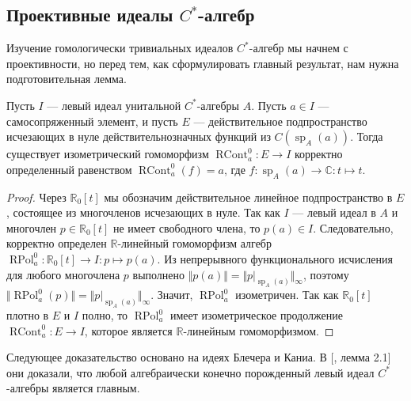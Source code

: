 
\subsection{Проективные идеалы \texorpdfstring{$C^*$}{C*}-алгебр}
\label{SubSectionProjectiveIdealsOfCStarAlgebras}

Изучение гомологически тривиальных идеалов $C^*$-алгебр мы начнем с проективности, но перед тем, как сформулировать главный результат, нам нужна подготовительная лемма.

\begin{lemma}\label{ContFuncCalcOnIdealOfCStarAlg} Пусть $I$ --- левый идеал унитальной $C^*$-алгебры $A$. Пусть $a\in I$ --- самосопряженный элемент, и пусть $E$ --- действительное подпространство исчезающих в нуле действительнозначных функций из $C(\operatorname{sp}_A(a))$. Тогда существует изометрический гомоморфизм $\operatorname{RCont}_a^0:E\to I$ корректно определенный равенством $\operatorname{RCont}_a^0(f)=a$, где $f:\operatorname{sp}_A(a)\to\mathbb{C}:t\mapsto t$.
\end{lemma}
\begin{proof} Через $\mathbb{R}_0[t]$ мы обозначим действительное линейное подпространство в $E$, состоящее из многочленов исчезающих в нуле. Так как $I$ --- левый идеал в $A$ и многочлен $p\in\mathbb{R}_0[t]$ не имеет свободного члена, то $p(a)\in I$. Следовательно, корректно определен $\mathbb{R}$-линейный гомоморфизм алгебр $\operatorname{RPol}_a^0:\mathbb{R}_0[t]\to I:p\mapsto p(a)$. Из непрерывного функционального исчисления для любого многочлена $p$ выполнено $\Vert p(a)\Vert=\Vert p|_{\operatorname{sp}_A(a)}\Vert_\infty$, поэтому $\Vert\operatorname{RPol}_a^0(p)\Vert=\Vert p|_{\operatorname{sp}_A(a)}\Vert_\infty$. Значит, $\operatorname{RPol}_a^0$ изометричен. Так как $\mathbb{R}_0[t]$ плотно в $E$ и $I$ полно, то $\operatorname{RPol}_a^0$ имеет изометрическое продолжение $\operatorname{RCont}_a^0:E\to I$, которое является $\mathbb{R}$-линейным гомоморфизмом. 
\end{proof}

Следующее доказательство основано на идеях Блечера и Каниа. В [\cite{BleKanFinGenCStarAlgHilbMod}, лемма 2.1] они доказали, что любой алгебраически конечно порожденный левый идеал $C^*$-алгебры является главным.  


